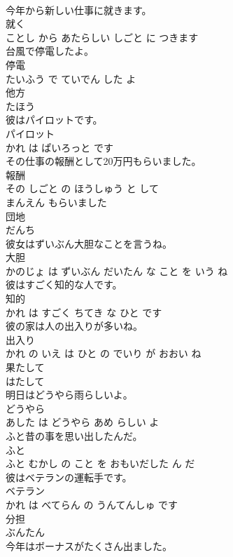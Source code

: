 \documentclass[8pt]{extreport}
\begin{document}
\begin{CJK}{UTF8}{min}
\\	今年から新しい仕事に就きます。	
\\	就く 
\\	ことし から あたらしい しごと に つきます			
\\	台風で停電したよ。	
\\	停電 
\\	たいふう で ていでん した よ			
\\	他方	
\\	たほう			
\\	彼はパイロットです。	
\\	パイロット 
\\	かれ は ぱいろっと です			
\\	その仕事の報酬として20万円もらいました。	
\\	報酬 
\\	その しごと の ほうしゅう と して 
\\	まんえん もらいました			
\\	団地	
\\	だんち			
\\	彼女はずいぶん大胆なことを言うね。	
\\	大胆 
\\	かのじょ は ずいぶん だいたん な こと を いう ね			
\\	彼はすごく知的な人です。	
\\	知的 
\\	かれ は すごく ちてき な ひと です			
\\	彼の家は人の出入りが多いね。	
\\	出入り 
\\	かれ の いえ は ひと の でいり が おおい ね			
\\	果たして	
\\	はたして			
\\	明日はどうやら雨らしいよ。	
\\	どうやら 
\\	あした は どうやら あめ らしい よ			
\\	ふと昔の事を思い出したんだ。	
\\	ふと 
\\	ふと むかし の こと を おもいだした ん だ			
\\	彼はベテランの運転手です。	
\\	ベテラン 
\\	かれ は べてらん の うんてんしゅ です			
\\	分担	
\\	ぶんたん			
\\	今年はボーナスがたくさん出ました。	

\end{CJK}
\end{document}
